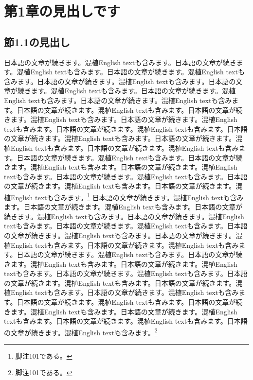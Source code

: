 \documentclass[pdflatex,book]{jlreq}
\begin{document}
\tableofcontents
\chapter{第1章の見出しです}
\section{節1.1の見出し}
日本語の文章が続きます。混植English textも含みます。日本語の文章が続きます。混植English textも含みます。日本語の文章が続きます。混植English textも含みます。日本語の文章が続きます。混植English textも含みます。日本語の文章が続きます。混植English textも含みます。日本語の文章が続きます。混植English textも含みます。日本語の文章が続きます。混植English textも含みます。日本語の文章が続きます。混植English textも含みます。日本語の文章が続きます。混植English textも含みます。日本語の文章が続きます。混植English textも含みます。日本語の文章が続きます。混植English textも含みます。日本語の文章が続きます。混植English textも含みます。日本語の文章が続きます。混植English textも含みます。日本語の文章が続きます。混植English textも含みます。日本語の文章が続きます。混植English textも含みます。日本語の文章が続きます。混植English textも含みます。日本語の文章が続きます。混植English textも含みます。日本語の文章が続きます。混植English textも含みます。日本語の文章が続きます。混植English textも含みます。日本語の文章が続きます。混植English textも含みます。\footnote{脚注101である。}
日本語の文章が続きます。混植English textも含みます。日本語の文章が続きます。混植English textも含みます。日本語の文章が続きます。混植English textも含みます。日本語の文章が続きます。混植English textも含みます。日本語の文章が続きます。混植English textも含みます。日本語の文章が続きます。混植English textも含みます。日本語の文章が続きます。混植English textも含みます。日本語の文章が続きます。混植English textも含みます。日本語の文章が続きます。混植English textも含みます。日本語の文章が続きます。混植English textも含みます。日本語の文章が続きます。混植English textも含みます。日本語の文章が続きます。混植English textも含みます。日本語の文章が続きます。混植English textも含みます。日本語の文章が続きます。混植English textも含みます。日本語の文章が続きます。混植English textも含みます。日本語の文章が続きます。混植English textも含みます。日本語の文章が続きます。混植English textも含みます。日本語の文章が続きます。混植English textも含みます。日本語の文章が続きます。混植English textも含みます。日本語の文章が続きます。混植English textも含みます。\footnote{脚注101である。}
\end{document}
